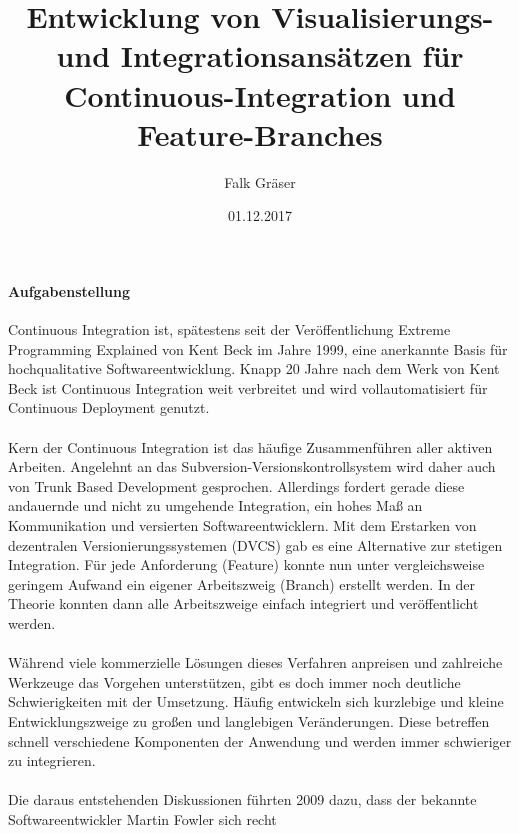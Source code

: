 \documentclass[11pt,english,german]{article}
\begin{document}
\sffamily

\title{\vspace{-2.0cm}\textbf{Entwicklung von Visualisierungs- und Integrationsansätzen für Continuous-Integration und Feature-Branches}}
\author{Falk Gräser}
\date{01.12.2017}

\maketitle
{}

\paragraph{\textsf{Aufgabenstellung}}
Continuous Integration ist, spätestens seit der Veröffentlichung \glqq Extreme Programming Explained\grqq{}  von Kent Beck im Jahre 1999,
eine anerkannte Basis für hochqualitative Softwareentwicklung. Knapp 20 Jahre nach dem Werk von Kent Beck ist Continuous Integration weit
verbreitet und wird vollautomatisiert für Continuous Deployment genutzt.
\\
\\
Kern der Continuous Integration ist das häufige Zusammenführen aller aktiven Arbeiten. Angelehnt an das \glqq Subversion\grqq{}-Versionskontrollsystem
wird daher auch von \glqq Trunk Based Development\grqq{} gesprochen.
Allerdings fordert gerade diese andauernde und nicht zu umgehende Integration, ein hohes Maß an Kommunikation und versierten Softwareentwicklern.
Mit dem Erstarken von dezentralen Versionierungssystemen (DVCS) gab es eine Alternative zur stetigen Integration. Für jede Anforderung (Feature)
konnte nun unter vergleichsweise geringem Aufwand ein eigener Arbeitszweig (Branch) erstellt werden. In der Theorie konnten
dann alle Arbeitszweige \glqq einfach\grqq{} integriert und veröffentlicht werden.
\\
\\
Während viele kommerzielle Lösungen dieses Verfahren anpreisen und zahlreiche Werkzeuge das Vorgehen unterstützen, gibt
es doch immer noch deutliche Schwierigkeiten mit der Umsetzung. Häufig entwickeln sich \glqq kurzlebige und kleine\grqq{}
Entwicklungszweige zu \glqq großen und langlebigen\grqq{} Veränderungen. Diese betreffen schnell verschiedene Komponenten
der Anwendung und werden immer schwieriger zu integrieren.
\\
\\
Die daraus entstehenden Diskussionen führten 2009 dazu, dass der bekannte Softwareentwickler Martin Fowler sich recht
\end{document}
